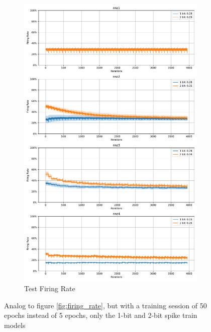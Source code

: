     \begin{figure}[!htpb]
        \ContinuedFloat
        \begin{subfigure}[H]{0.9\textwidth}
            \centering
            \includegraphics[width=\textwidth]{../firerate/FashionMNIST/plots/fashionmnist_test_firerate.pdf}
            \caption{Test Firing Rate}
        \end{subfigure}
        \caption{Analog to figure \ref{fig:firing_rate}, but with a training session of 50 epochs instead of 5 epochs, only the 1-bit and 2-bit spike train models}
        \label{fig:long_firing_rate}
    \end{figure}

